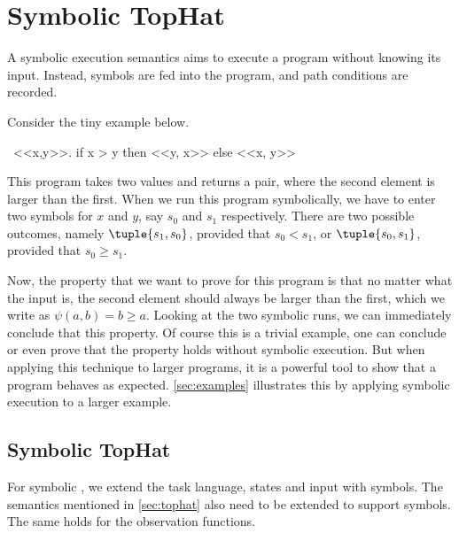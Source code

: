
\section{Symbolic TopHat}
\label{sec:symbolic}

A symbolic execution semantics aims to execute a program without knowing its input.
Instead, symbols are fed into the program, and path conditions are recorded.

Consider the tiny example below.
\begin{TASK}
  \ <<x,y>>. if x > y then <<y, x>> else <<x, y>>
\end{TASK}

This program takes two values and returns a pair, where the second element is larger than the first.
When we run this program symbolically, we have to enter two symbols for $x$ and $y$, say $s_0$ and $s_1$ respectively.
There are two possible outcomes, namely
$\tuple{s_1,s_0}$, provided that $s_0 < s_1$, or
$\tuple{s_0,s_1}$, provided that $s_0 \geq s_1$.

Now, the property that we want to prove for this program is that no matter what the input is, the second element should always be larger than the first, which we write as $\psi(a,b)= b \geq a$.
Looking at the two symbolic runs, we can immediately conclude that this property.
Of course this is a trivial example, one can conclude or even prove that the property holds without symbolic execution.
But when applying this technique to larger programs, it is a powerful tool to show that a program behaves as expected.
\cref{sec:examples} illustrates this by applying symbolic execution to a larger example.


\subsection{Symbolic TopHat}

For symbolic \TOPHAT, we extend the task language, states and input with symbols.
The semantics mentioned in \cref{sec:tophat} also need to be extended to support symbols.
The same holds for the observation functions.


